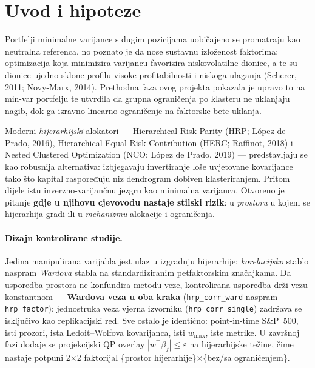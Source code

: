 \documentclass[11pt]{article}
\renewcommand{\contentsname}{Pregled sadržaja}
\begin{document}
\clearpage
\renewcommand{\contentsname}{Sadržaj}
\tableofcontents
\clearpage

\section{Uvod i hipoteze}

Portfelji minimalne varijance s dugim pozicijama uobičajeno se promatraju kao
neutralna referenca, no poznato je da nose sustavnu izloženost faktorima:
optimizacija koja minimizira varijancu favorizira niskovolatilne dionice, a te
su dionice ujedno sklone profilu visoke profitabilnosti i niskoga ulaganja
(Scherer, 2011; Novy-Marx, 2014). Prethodna faza ovog projekta pokazala je
upravo to na min-var portfelju te utvrdila da grupna ograničenja po klasteru ne
uklanjaju nagib, dok ga izravno linearno ograničenje na faktorske bete uklanja.

Moderni \emph{hijerarhijski} alokatori --- Hierarchical Risk Parity (HRP; López
de Prado, 2016), Hierarchical Equal Risk Contribution (HERC; Raffinot, 2018) i
Nested Clustered Optimization (NCO; López de Prado, 2019) --- predstavljaju se
kao robusnija alternativa: izbjegavaju invertiranje loše uvjetovane kovarijance
tako što kapital raspoređuju niz dendrogram dobiven klasteriranjem. Pritom dijele
istu inverzno-varijančnu jezgru kao minimalna varijanca. Otvoreno je pitanje
\textbf{gdje u njihovu cjevovodu nastaje stilski rizik}: u \emph{prostoru} u
kojem se hijerarhija gradi ili u \emph{mehanizmu} alokacije i ograničenja.

\paragraph{Dizajn kontrolirane studije.} Jedina manipulirana varijabla jest
ulaz u izgradnju hijerarhije: \emph{korelacijsko} stablo naspram \emph{Wardova}
stabla na standardiziranim petfaktorskim značajkama. Da usporedba prostora ne
konfundira metodu veze, kontrolirana usporedba drži vezu konstantnom ---
\textbf{Wardova veza u oba kraka} (\texttt{hrp\_corr\_ward} naspram
\texttt{hrp\_factor}); jednostruka veza vjerna izvorniku (\texttt{hrp\_corr\_single})
zadržava se isključivo kao replikacijski red. Sve ostalo je identično:
point-in-time S\&P~500, isti prozori, ista Ledoit--Wolfova kovarijanca, isti
$w_{\max}$, iste metrike. U završnoj fazi dodaje se projekcijski QP overlay
$|w^{\!\top}\beta_f|\le\varepsilon$ na hijerarhijske težine, čime nastaje potpuni
2$\times$2 faktorijal \{prostor hijerarhije\}$\times$\{bez/sa ograničenjem\}.
\end{document}
